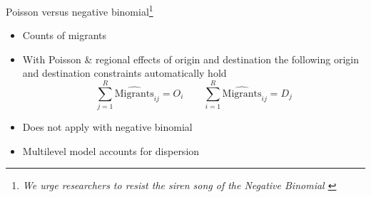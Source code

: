 \documentclass{beamer}
\begin{document}
\begin{frame}{Poisson versus negative binomial\footnote{
			\emph{We urge researchers to resist the siren song of the Negative
			Binomial \footnotesize{ \citep{head2014gravity}} }
			}}
	
	\begin{itemize}
		\item Counts of migrants\newline 
		\item 	With Poisson \& regional effects of origin and destination the following origin and destination \alert{constraints} automatically hold
		$$
		\sum_{j=1}^{R} {\widehat{\text{Migrants} }_{ij} } = O_i \qquad \sum_{i=1}^{R} {\widehat{\text{Migrants} }_{ij} } = D_j
		$$

	\item  Does not apply with negative binomial \newline
	\item Multilevel model accounts for dispersion
		\end{itemize}

\end{frame}
\end{document}
